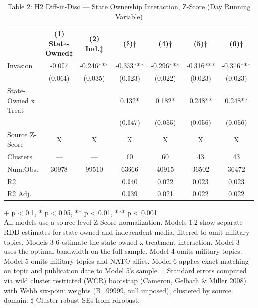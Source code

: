 \begin{table}[t]
\caption{\label{tab:table-02}Table 2: H2 Diff-in-Disc — State Ownership Interaction, Z-Score (Day Running Variable)} 
\fontsize{12.0pt}{14.0pt}\selectfont
\begin{tabular*}{\linewidth}{@{\extracolsep{\fill}}lcccccc}
\toprule
  & (1) State-Owned‡ & (2) Ind.‡ & (3)† & (4)† & (5)† & (6)† \\ 
\midrule\addlinespace[2.5pt]
Invasion & -0.097 & -0.246*** & -0.333*** & -0.296*** & -0.316*** & -0.316*** \\ 
 & (0.064) & (0.035) & (0.023) & (0.022) & (0.023) & (0.023) \\ 
State-Owned x Treat &  &  & 0.132* & 0.182* & 0.248** & 0.248** \\ 
{} & {} & {} & {(0.047)} & {(0.055)} & {(0.056)} & {(0.056)} \\ 
Source Z-Score & X & X & X & X & X & X \\ 
Clusters & — & — & 60 & 60 & 43 & 43 \\ 
Num.Obs. & 30978 & 99510 & 63666 & 40915 & 36502 & 36472 \\ 
R2 &  &  & 0.040 & 0.022 & 0.023 & 0.023 \\ 
R2 Adj. &  &  & 0.039 & 0.021 & 0.022 & 0.022 \\ 
\bottomrule
\end{tabular*}
\begin{minipage}{\linewidth}
\vspace{.05em}
+ p < 0.1, * p < 0.05, ** p < 0.01, *** p < 0.001\\
All models use a source-level Z-Score normalization. Models 1-2 show separate
RDD estimates for state-owned and independent media, filtered to omit military
topics. Models 3-6 estimate the state-owned x treatment interaction. Model 3
uses the optimal bandwidth on the full sample. Model 4 omits military topics.
Model 5 omits military topics and NATO allies. Model 6 applies exact matching on
topic and publication date to Model 5's sample. † Standard errors computed via
wild cluster restricted (WCR) bootstrap (Cameron, Gelbach \& Miller 2008) with
Webb six-point weights (B=99999, null imposed), clustered by source domain. ‡
Cluster-robust SEs from rdrobust.\\
\end{minipage}
\end{table}

